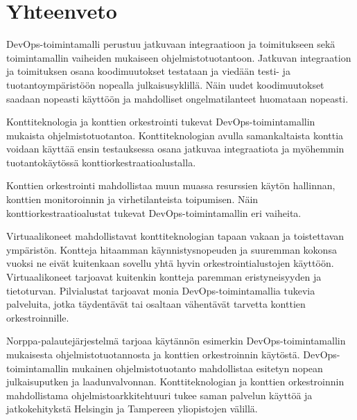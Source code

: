 \chapter{Yhteenveto\label{summary}}

DevOps-toimintamalli perustuu jatkuvaan integraatioon ja toimitukseen sekä toimintamallin vaiheiden mukaiseen ohjelmistotuotantoon.
Jatkuvan integraation ja toimituksen osana koodimuutokset testataan ja viedään testi- ja tuotantoympäristöön nopealla julkaisusyklillä.
Näin uudet koodimuutokset saadaan nopeasti käyttöön ja mahdolliset ongelmatilanteet huomataan nopeasti.

Konttiteknologia ja konttien orkestrointi tukevat DevOps-toimintamallin mukaista ohjelmistotuotantoa.
Konttiteknologian avulla samankaltaista konttia voidaan käyttää ensin testauksessa osana jatkuvaa integraatiota ja myöhemmin tuotantokäytössä konttiorkestraatioalustalla.

Konttien orkestrointi mahdollistaa muun muassa resurssien käytön hallinnan, konttien monitoroinnin ja virhetilanteista toipumisen.
Näin konttiorkestraatioalustat tukevat DevOps-toimintamallin eri vaiheita.

Virtuaalikoneet mahdollistavat konttiteknologian tapaan vakaan ja toistettavan ympäristön.
Kontteja hitaamman käynnistysnopeuden ja suuremman kokonsa vuoksi ne eivät kuitenkaan sovellu yhtä hyvin orkestrointialustojen käyttöön.
Virtuaalikoneet tarjoavat kuitenkin kontteja paremman eristyneisyyden ja tietoturvan.
Pilvialustat tarjoavat monia DevOps-toimintamallia tukevia palveluita, jotka täydentävät tai osaltaan vähentävät tarvetta konttien orkestroinnille.

Norppa-palautejärjestelmä tarjoaa käytännön esimerkin DevOps-toimintamallin mukaisesta ohjelmistotuotannosta ja konttien orkestroinnin käytöstä.
DevOps-toimintamallin mukainen ohjelmistotuotanto mahdollistaa esitetyn nopean julkaisuputken ja laadunvalvonnan.
Konttiteknologian ja konttien orkestroinnin mahdollistama ohjelmistoarkkitehtuuri tukee saman palvelun käyttöä ja jatkokehitykstä Helsingin ja Tampereen yliopistojen välillä.

